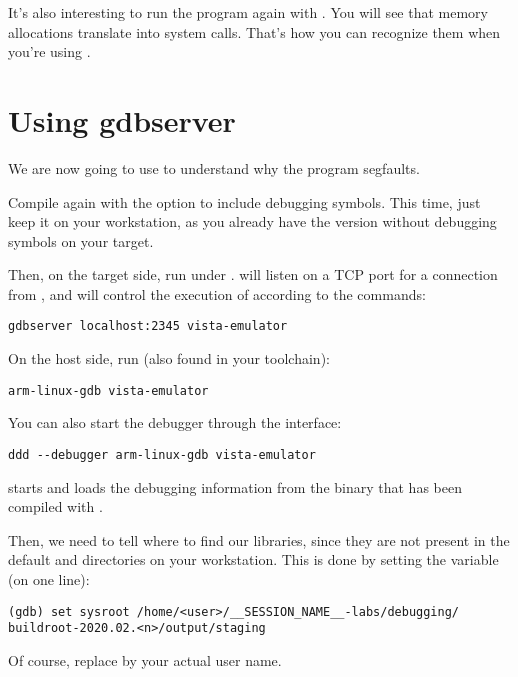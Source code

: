 It's also interesting to run the program again with . You
will see that memory allocations translate into  system 
calls. That's how you can recognize them when you're using
.

\section{Using gdbserver}

We are now going to use  to understand why the program
segfaults.

Compile  again with the  option to
include debugging symbols. This time, just keep it on your workstation,
as you already have the version without debugging symbols on your target.

Then, on the target side, run  under
.  will listen on a TCP port for a
connection from , and will control the execution of
 according to the  commands:

\begin{verbatim}
gdbserver localhost:2345 vista-emulator
\end{verbatim}

On the host side, run  (also found in your toolchain):
\begin{verbatim}
arm-linux-gdb vista-emulator
\end{verbatim}

You can also start the debugger through the  interface:
\begin{verbatim}
ddd --debugger arm-linux-gdb vista-emulator
\end{verbatim}

 starts and loads the debugging information from the
 binary that has been compiled with .

Then, we need to tell where to find our libraries, since they are not
present in the default  and  directories on
your workstation. This is done by setting the  
variable (on one line):

\begin{verbatim}
(gdb) set sysroot /home/<user>/__SESSION_NAME__-labs/debugging/
buildroot-2020.02.<n>/output/staging
\end{verbatim}

Of course, replace  by your actual user name.

